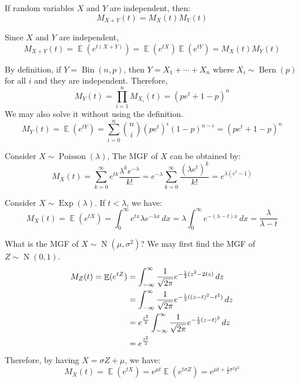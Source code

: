 \documentclass{huhtakm-template-book-v2}
\DeclareMathOperator{\E}{\mathbb{E}}
\DeclareMathOperator{\Bern}{Bern}
\DeclareMathOperator{\Bin}{Bin}
\DeclareMathOperator{\Poisson}{Poisson}
\DeclareMathOperator{\Exp}{Exp}
\DeclareMathOperator{\N}{N}
\begin{document}
\begin{lem}
	If random variables $X$ and $Y$ are independent, then:
	\begin{equation*}
		M_{X+Y}(t)=M_{X}(t)M_{Y}(t)
	\end{equation*}
\end{lem}
\begin{proofing}
	Since $X$ and $Y$ are independent,
	\begin{equation*}
		M_{X+Y}(t)=\E(e^{t(X+Y)})=\E(e^{tX})\E(e^{tY})=M_{X}(t)M_{Y}(t)
	\end{equation*}
\end{proofing}
\begin{eg}
	By definition, if $Y=\Bin(n,p)$, then $Y=X_{1}+\cdots+X_{n}$ where $X_{i}\sim\Bern(p)$ for all $i$ and they are independent. Therefore,
	\begin{equation*}
		M_{Y}(t)=\prod_{i=1}^{n}M_{X_{i}}(t)=(pe^{t}+1-p)^{n}
	\end{equation*}
	We may also solve it without using the definition.
	\begin{equation*}
		M_{Y}(t)=\E(e^{tY})=\sum_{i=0}^{n}\binom{n}{i}(pe^{t})^{i}(1-p)^{n-i}=(pe^{t}+1-p)^{n}
	\end{equation*}
\end{eg}
\begin{eg}
	Consider $X\sim\Poisson(\lambda)$, The MGF of $X$ can be obtained by:
	\begin{equation*}
		M_{X}(t)=\sum_{k=0}^{\infty}e^{tk}\frac{\lambda^{k}e^{-\lambda}}{k!}=e^{-\lambda}\sum_{k=0}^{\infty}\frac{(\lambda e^{t})^{k}}{k!}=e^{\lambda(e^{t}-1)}
	\end{equation*}
\end{eg}
\begin{eg}
	Consider $X\sim\Exp(\lambda)$. If $t<\lambda$, we have:
	\begin{equation*}
		M_{X}(t)=\E(e^{tX})=\int_{0}^{\infty}e^{tx}\lambda e^{-\lambda x}\,dx=\lambda\int_{0}^{\infty}e^{-(\lambda-t)x}\,dx=\frac{\lambda}{\lambda-t}
	\end{equation*}
\end{eg}
\begin{eg}
	What is the MGF of $X\sim\N(\mu,\sigma^{2})$? We may first find the MGF of $Z\sim\N(0,1)$.
	\begin{align*}
		M_{Z}(t)=\E(e^{tZ})&=\intinfty\frac{1}{\sqrt{2\pi}}e^{-\frac{1}{2}(z^{2}-2tz)}\,dz\\
		&=\intinfty\frac{1}{\sqrt{2\pi}}e^{-\frac{1}{2}((z-t)^{2}-t^{2})}\,dz\\
		&=e^{\frac{t^{2}}{2}}\intinfty\frac{1}{\sqrt{2\pi}}e^{-\frac{1}{2}(z-t)^{2}}\,dz\\
		&=e^{\frac{t^{2}}{2}}
	\end{align*}
	Therefore, by having $X=\sigma Z+\mu$, we have:
	\begin{equation*}
		M_{X}(t)=\E(e^{tX})=e^{\mu t}\E(e^{t\sigma Z})=e^{\mu t+\frac{1}{2}\sigma^{2}t^{2}}
	\end{equation*}
\end{eg}
\end{document}
